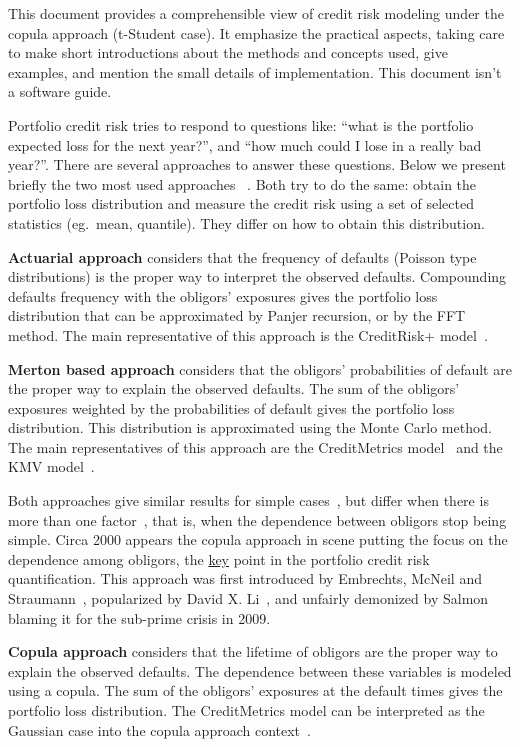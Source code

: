 \documentclass[11pt,fleqn]{book} %
\begin{document}
This document provides a comprehensible view of credit risk modeling under the
copula approach (t-Student case). It emphasize the practical aspects, taking 
care to make short introductions about the methods and concepts used, give 
examples, and mention the small details of implementation. This document isn't 
a software guide.

Portfolio credit risk tries to respond to questions like: \enquote{what is the 
portfolio expected loss for the next year?}, and \enquote{how much could I 
lose in a really bad year?}. There are several approaches to answer these 
questions. Below we present briefly the two most used approaches~\cite{crouhy:2000} 
\cite[chap. 2.4]{bluhm:2002}. Both try to do the same: obtain the portfolio 
loss distribution and measure the credit risk using a set of selected 
statistics (eg.\ mean, quantile). They differ on how to obtain this 
distribution. 

\textbf{Actuarial approach} considers that the frequency 
of defaults (Poisson type distributions) is the proper way to interpret the 
observed defaults. Compounding defaults frequency with the obligors' exposures 
gives the portfolio loss distribution that can be approximated by Panjer 
recursion, or by the FFT method. The main representative of this approach is 
the CreditRisk+ model~\cite{creditrisk+:1997}.

\textbf{Merton based approach} considers that the obligors' 
probabilities of default are the proper way to explain the observed defaults.
The sum of the obligors' exposures weighted by the probabilities of default 
gives the portfolio loss distribution. This distribution is approximated 
using the Monte Carlo method. The main representatives of this approach are the 
CreditMetrics\texttrademark{} model~\cite{cmetrics:1997} and the KMV 
model~\cite{kmv:2003}. 

Both approaches give similar results for simple cases~\cite{koyluoglu:1998},
but differ when there is more than one factor~\cite{bluhm:2001}, that is, 
when the dependence between obligors stop being simple. Circa 2000 appears
the copula approach in scene putting the focus on the dependence among 
obligors, the \underline{key} point in the portfolio credit risk quantification. 
This approach was first introduced by Embrechts, McNeil and 
Straumann~\cite{embrechts:2002}, popularized by David X. Li~\cite{li:2000}, 
and unfairly demonized by Salmon~\cite{salmon:2009} blaming it for the 
sub-prime crisis in 2009.

\textbf{Copula approach} considers that the lifetime of obligors
are the proper way to explain the observed defaults. The dependence between 
these variables is modeled using a copula. The sum of the obligors' exposures 
at the default times gives the portfolio loss distribution. The 
CreditMetrics\texttrademark{} model can be interpreted as the Gaussian case 
into the copula approach context~\cite{li:2000}.
\end{document}
